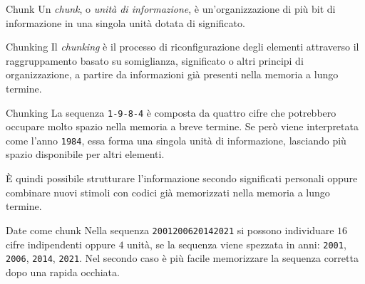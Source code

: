 \documentclass[a4paper]{article}
\begin{document}
\begin{snippetdefinition}{Chunk}
    Un \emph{chunk}, o \emph{unità di informazione}, è un'organizzazione di più bit di informazione in una singola unità dotata di significato.
\end{snippetdefinition}
\begin{snippetdefinition}{Chunking}
    Il \emph{chunking} è il processo di riconfigurazione degli elementi attraverso il raggruppamento basato su somiglianza, significato o altri principi di organizzazione, a partire da informazioni già presenti nella memoria a lungo termine.
\end{snippetdefinition}
\begin{snippetexample}{Chunking}
    La sequenza \texttt{1-9-8-4} è composta da quattro cifre che potrebbero occupare molto spazio nella memoria a breve termine. Se però viene interpretata come l'anno \texttt{1984}, essa forma una singola unità di informazione, lasciando più spazio disponibile per altri elementi.
\end{snippetexample}
È quindi possibile strutturare l'informazione secondo significati personali oppure combinare nuovi stimoli con codici già memorizzati nella memoria a lungo termine.
\begin{snippetexample}{Date come chunk}
    Nella sequenza \texttt{2001200620142021} si possono individuare \(16\) cifre indipendenti oppure \(4\) unità, se la sequenza viene spezzata in anni: \texttt{2001}, \texttt{2006}, \texttt{2014}, \texttt{2021}. Nel secondo caso è più facile memorizzare la sequenza corretta dopo una rapida occhiata.
\end{snippetexample}
\end{document}
